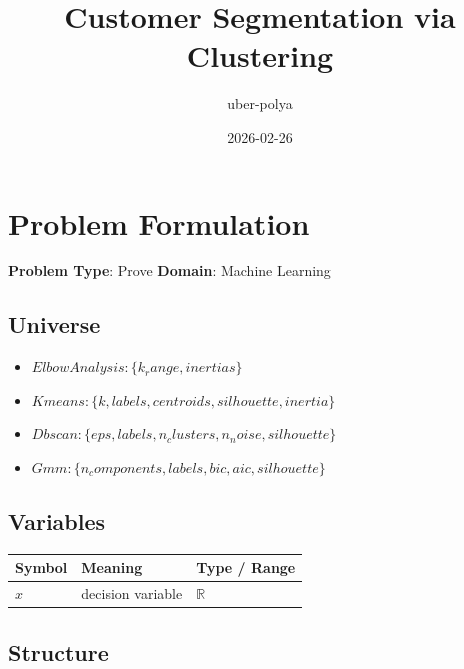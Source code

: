 \documentclass[11pt, a4paper]{article}
\title{Customer Segmentation via Clustering}
\author{uber-polya}
\date{2026-02-26}
\begin{document}
\maketitle
\tableofcontents
\newpage

\section{Problem Formulation}

\begin{polyamodel}

\textbf{Problem Type}: Prove \hfill
\textbf{Domain}: Machine Learning


\end{polyamodel}

\subsection{Universe}

\begin{itemize}
  \item $Elbow Analysis: \{k_range, inertias\}$
  \item $Kmeans: \{k, labels, centroids, silhouette, inertia\}$
  \item $Dbscan: \{eps, labels, n_clusters, n_noise, silhouette\}$
  \item $Gmm: \{n_components, labels, bic, aic, silhouette\}$
\end{itemize}

\subsection{Variables}

\begin{longtable}{lll}
\toprule
\textbf{Symbol} & \textbf{Meaning} & \textbf{Type / Range} \\
\midrule
\endhead
$x$ & decision variable & $\mathbb{{R}}$ \\
\bottomrule
\end{longtable}

\subsection{Structure}
\end{document}
